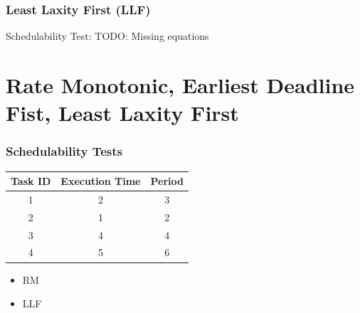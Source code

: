 \documentclass[xcolor=table]{beamer}
\begin{document}
\begin{frame}
\frametitle{Least Laxity First (\textbf{LLF})}

\begin{block}{Schedulability Test:}
TODO: Missing equations
\end{block}

\end{frame}
\section{Rate Monotonic, Earliest Deadline Fist, Least Laxity First}
\begin{frame}
\frametitle{Schedulability Tests}
\begin{table}[]
\begin{tabular}{|c|c|c|}
\hline
\textbf{Task ID} & \textbf{Execution Time} & \textbf{Period}\\ \hline
\cellcolor[HTML]{ECF6CE}1 &\cellcolor[HTML]{ECF6CE}2 &\cellcolor[HTML]{ECF6CE}3 \\ \hline
\cellcolor[HTML]{A4A4A4}2 &\cellcolor[HTML]{A4A4A4}1 &\cellcolor[HTML]{A4A4A4}2 \\ \hline
\cellcolor[HTML]{F781D8}3 &\cellcolor[HTML]{F781D8}4 &\cellcolor[HTML]{F781D8}4 \\ \hline
\cellcolor[HTML]{8181F7}4 &\cellcolor[HTML]{8181F7}5 &\cellcolor[HTML]{8181F7}6 \\ \hline
\end{tabular}
\end{table}
\begin{itemize}
\item RM
\item LLF
\end{itemize}
\end{frame}
\end{document}
